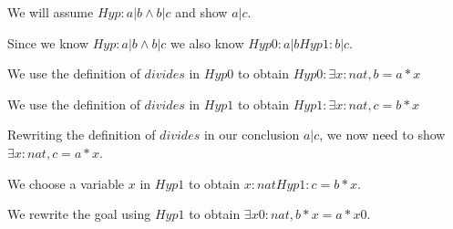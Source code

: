 \documentclass[11pt, oneside]{article}
\begin{document}
\begin{subproof}
\begin{subproof}
\begin{subproof}
 \begin{subproof}We will assume $Hyp : a | b \land b | c $ and show $a | c $.\begin{subproof}Since we know $Hyp : a | b \land b | c $ we also know $Hyp0 : a | b 
Hyp1 : b | c $.\begin{subproof}We use the definition of $divides$ in $Hyp0$ to obtain $Hyp0 : \exists x : nat, b = a * x $ \begin{subproof}We use the definition of $divides$ in $Hyp1$ to obtain $Hyp1 : \exists x : nat, c = b * x $ \begin{subproof}Rewriting the definition of $divides$ in our conclusion $a | c $, we now need to show $\exists x : nat, c = a * x $.\begin{subproof}We choose a variable $x$ in $Hyp1$ to obtain $x : nat 
Hyp1 : c = b * x $.\begin{subproof}We rewrite the goal using $Hyp1$ to obtain $\exists x0 : nat, b * x = a * x0 $.
\end{subproof}
\end{subproof}
\end{subproof}
\end{subproof}
\end{subproof}
\end{subproof}
\end{subproof}
\end{subproof}
\end{subproof}
\end{subproof}
\end{document}
